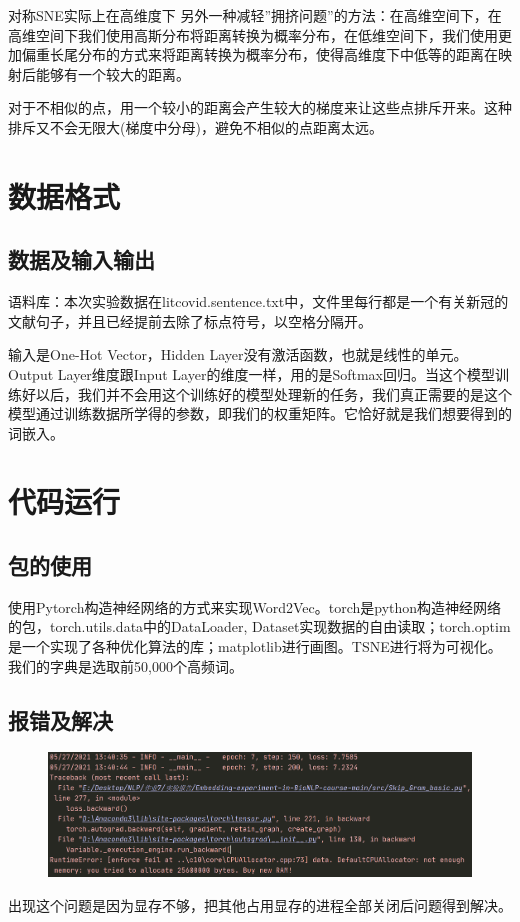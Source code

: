 \documentclass[12pt]{article}
\begin{document}
	对称SNE实际上在高维度下 另外一种减轻”拥挤问题”的方法：在高维空间下，在高维空间下我们使用高斯分布将距离转换为概率分布，在低维空间下，我们使用更加偏重长尾分布的方式来将距离转换为概率分布，使得高维度下中低等的距离在映射后能够有一个较大的距离。

对于不相似的点，用一个较小的距离会产生较大的梯度来让这些点排斥开来。这种排斥又不会无限大(梯度中分母)，避免不相似的点距离太远。

\section{数据格式}
\subsection{数据及输入输出}
语料库：本次实验数据在litcovid.sentence.txt中，文件里每行都是一个有关新冠的文献句子，并且已经提前去除了标点符号，以空格分隔开。\par
输入是One-Hot Vector，Hidden Layer没有激活函数，也就是线性的单元。Output Layer维度跟Input Layer的维度一样，用的是Softmax回归。当这个模型训练好以后，我们并不会用这个训练好的模型处理新的任务，我们真正需要的是这个模型通过训练数据所学得的参数，即我们的权重矩阵。它恰好就是我们想要得到的词嵌入。




\section{代码运行}
\subsection{包的使用}
使用Pytorch构造神经网络的方式来实现Word2Vec。torch是python构造神经网络的包，torch.utils.data中的DataLoader, Dataset实现数据的自由读取；torch.optim是一个实现了各种优化算法的库；matplotlib进行画图。TSNE进行将为可视化。
我们的字典是选取前50,000个高频词。
\subsection{报错及解决}
\begin{figure}[H]
  \centering
  \includegraphics[scale=0.3]{./picture/error.png} %
  \caption{} %
  \label{zzaa} %
\end{figure}
出现这个问题是因为显存不够，把其他占用显存的进程全部关闭后问题得到解决。
\end{document}
